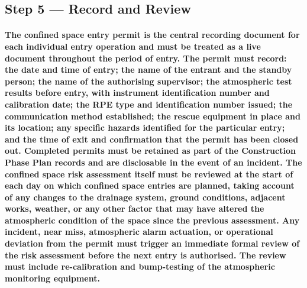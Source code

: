 \subsection{Step 5 --- Record and Review}
\paragraph{The confined space entry permit is the central recording document for each individual entry operation and must be treated as a live document throughout the period of entry. The permit must record: the date and time of entry; the name of the entrant and the standby person; the name of the authorising supervisor; the atmospheric test results before entry, with instrument identification number and calibration date; the RPE type and identification number issued; the communication method established; the rescue equipment in place and its location; any specific hazards identified for the particular entry; and the time of exit and confirmation that the permit has been closed out. Completed permits must be retained as part of the Construction Phase Plan records and are disclosable in the event of an incident. The confined space risk assessment itself must be reviewed at the start of each day on which confined space entries are planned, taking account of any changes to the drainage system, ground conditions, adjacent works, weather, or any other factor that may have altered the atmospheric condition of the space since the previous assessment. Any incident, near miss, atmospheric alarm actuation, or operational deviation from the permit must trigger an immediate formal review of the risk assessment before the next entry is authorised. The review must include re-calibration and bump-testing of the atmospheric monitoring equipment.}

